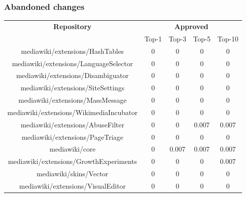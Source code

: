 \subsubsection{Abandoned changes}
\begin{center}
\hspace{0.25cm}
\begin{tabular}{@{}c c c c c@{}} 
 \hline
    \textbf{Repository} &
    \multicolumn{4}{c}{\textbf{Approved}} \\
      & {Top-1} & {Top-3} & {Top-5} & {Top-10} \\
      \hline
mediawiki/extensions/HashTables & 0 & 0 & 0 & 0 \\
mediawiki/extensions/LanguageSelector & 0 & 0 & 0 & 0 \\
mediawiki/extensions/Disambiguator & 0 & 0 & 0 & 0 \\
mediawiki/extensions/SiteSettings & 0 & 0 & 0 & 0 \\
mediawiki/extensions/MassMessage & 0 & 0 & 0 & 0 \\
mediawiki/extensions/WikimediaIncubator & 0 & 0 & 0 & 0 \\
mediawiki/extensions/AbuseFilter & 0 & 0 & 0.007 & 0.007 \\
mediawiki/extensions/PageTriage & 0 & 0 & 0 & 0 \\
mediawiki/core & 0 & 0.007 & 0.007 & 0.007 \\
mediawiki/extensions/GrowthExperiments & 0 & 0 & 0 & 0.007 \\
mediawiki/skins/Vector & 0 & 0 & 0 & 0 \\
mediawiki/extensions/VisualEditor & 0 & 0 & 0 & 0 \\
\hline
\end{tabular}


\end{center}

